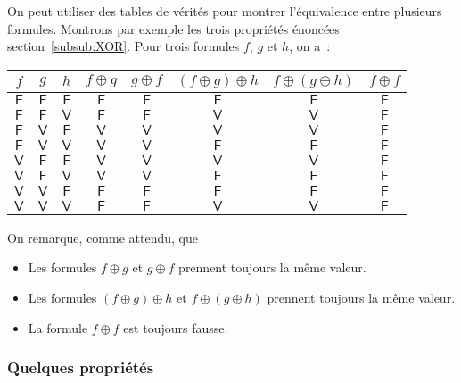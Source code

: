 On peut utiliser des tables de vérités pour montrer l'équivalence entre plusieurs formules. 
Montrons par exemple les trois propriétés énoncées section~\ref{subsub:XOR}. 
Pour trois formules $f$, $g$ et $h$, on a :
\begin{center}
\begin{tabular}{c c c | c c c c c}
    $f$ & $g$ & $h$ & $f \oplus g$ & $g \oplus f$ & $(f \oplus g) \oplus h$ & $f \oplus (g \oplus h)$ & $f \oplus f$ 
    \\ \hline 
    $\mathsf{F}$ & $\mathsf{F}$ & $\mathsf{F}$ & $\mathsf{F}$ & $\mathsf{F}$ & $\mathsf{F}$ & $\mathsf{F}$ & $\mathsf{F}$
    \\
    $\mathsf{F}$ & $\mathsf{F}$ & $\mathsf{V}$ & $\mathsf{F}$ & $\mathsf{F}$ & $\mathsf{V}$ & $\mathsf{V}$ & $\mathsf{F}$
    \\
    $\mathsf{F}$ & $\mathsf{V}$ & $\mathsf{F}$ & $\mathsf{V}$ & $\mathsf{V}$ & $\mathsf{V}$ & $\mathsf{V}$ & $\mathsf{F}$
    \\
    $\mathsf{F}$ & $\mathsf{V}$ & $\mathsf{V}$ & $\mathsf{V}$ & $\mathsf{V}$ & $\mathsf{F}$ & $\mathsf{F}$ & $\mathsf{F}$
    \\
    $\mathsf{V}$ & $\mathsf{F}$ & $\mathsf{F}$ & $\mathsf{V}$ & $\mathsf{V}$ & $\mathsf{V}$ & $\mathsf{V}$ & $\mathsf{F}$
    \\
    $\mathsf{V}$ & $\mathsf{F}$ & $\mathsf{V}$ & $\mathsf{V}$ & $\mathsf{V}$ & $\mathsf{F}$ & $\mathsf{F}$ & $\mathsf{F}$
    \\
    $\mathsf{V}$ & $\mathsf{V}$ & $\mathsf{F}$ & $\mathsf{F}$ & $\mathsf{F}$ & $\mathsf{F}$ & $\mathsf{F}$ & $\mathsf{F}$
    \\
    $\mathsf{V}$ & $\mathsf{V}$ & $\mathsf{V}$ & $\mathsf{F}$ & $\mathsf{F}$ & $\mathsf{V}$ & $\mathsf{V}$ & $\mathsf{F}$
    \\
\end{tabular}
\end{center}
On remarque, comme attendu, que
\begin{itemize}[nosep]
    \item Les formules $f \oplus g$ et $g \oplus f$ prennent toujours la même valeur.
    \item Les formules $(f \oplus g) \oplus h$ et $f \oplus (g \oplus h)$ prennent toujours la même valeur.
    \item La formule $f \oplus f$ est toujours fausse.
\end{itemize}

\subsubsection{Quelques propriétés}

